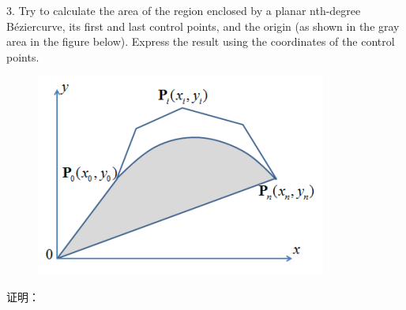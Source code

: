 \documentclass{article}
\newcommand{\Bezier}{B\'ezier}%
\begin{document}
	3. Try to calculate the area of the region enclosed by a planar nth-degree
	\Bezier curve, its first and last control points, and the origin (as shown in
	the gray area in the figure below). Express the result using the coordinates
	of the control points.\\
	\begin{figure}[H]
		\centering
		\includegraphics{a}
		\label{fig:a}
	\end{figure}
	证明：
	
\end{document}
